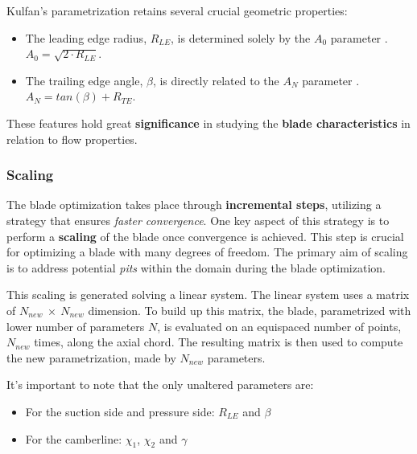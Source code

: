Kulfan's parametrization retains several crucial geometric properties:

\begin{itemize}
  \item The leading edge radius, $R_{LE}$, is determined solely by the $A_0$ parameter \cite[App. B]{kulfan2008universal}. $A_0 = \sqrt{2 \cdot R_{LE}}$.
  \item The trailing edge angle, $\beta$, is directly related to the $A_{N}$ parameter \cite[App. A]{kulfan2008universal}. $A_N = tan(\beta) + R_{TE}$.
\end{itemize}

These features hold great \textbf{significance} in studying the \textbf{blade characteristics} in relation to flow properties.

\subsubsection{Scaling}

The blade optimization takes place through \textbf{incremental steps}, utilizing a strategy that ensures \textit{faster convergence}. One key aspect of this strategy is to perform a \textbf{scaling} of the blade once convergence is achieved. 
This step is crucial for optimizing a blade with many degrees of freedom. 
The primary aim of scaling is to address potential \textit{pits} within the domain during the blade optimization.

This scaling is generated solving a linear system. The linear system uses a matrix of $N_{new} \ \times \ N_{new}$ dimension. 
To build up this matrix, the blade, parametrized with lower number of parameters $N$, is evaluated on an equispaced number of points, $N_{new}$ times, along the axial chord.  
The resulting matrix is then used to compute the new parametrization, made by $N_{new}$ parameters.

It's important to note that the only unaltered parameters are:

\begin{itemize}
    \item For the suction side and pressure side: $R_{LE}$ and $\beta$
    \item For the camberline: $\chi_1$, $\chi_2$ and $\gamma$
\end{itemize}

